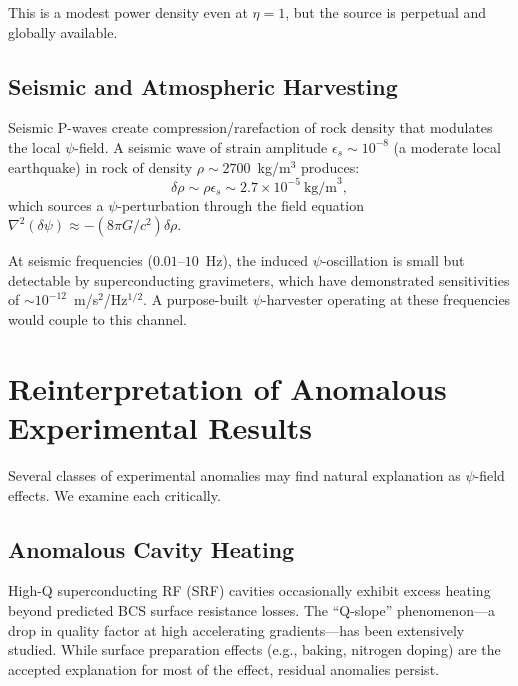 \documentclass[aps,prd,twocolumn,showpacs,preprintnumbers,superscriptaddress,nofootinbib]{revtex4-2}
\begin{document}
This is a modest power density even at $\eta = 1$, but the source is
perpetual and globally available.

\subsection{Seismic and Atmospheric Harvesting}\label{sec:seismic}

Seismic P-waves create compression/rarefaction of rock density that
modulates the local $\psi$-field.  A seismic wave of strain amplitude
$\epsilon_s \sim 10^{-8}$ (a moderate local earthquake) in rock of
density $\rho \sim 2700$~kg/m$^3$ produces:
\begin{equation}
\delta\rho \sim \rho\epsilon_s \sim 2.7\times 10^{-5}~\text{kg/m}^3,
\end{equation}
which sources a $\psi$-perturbation through the field equation
$\nabla^2(\delta\psi) \approx -(8\pi G/c^2)\delta\rho$.

At seismic frequencies ($0.01$--$10$~Hz), the induced $\psi$-oscillation
is small but detectable by superconducting gravimeters, which have
demonstrated sensitivities of $\sim 10^{-12}$~m/s$^2$/Hz$^{1/2}$.
A purpose-built $\psi$-harvester operating at these frequencies would
couple to this channel.

\section{Reinterpretation of Anomalous Experimental Results}\label{sec:anomalous}

Several classes of experimental anomalies may find natural explanation
as $\psi$-field effects.  We examine each critically.

\subsection{Anomalous Cavity Heating}\label{sec:cavity-heating}

High-Q superconducting RF (SRF) cavities occasionally exhibit excess
heating beyond predicted BCS surface resistance losses.  The ``Q-slope''
phenomenon---a drop in quality factor at high accelerating
gradients---has been extensively studied.  While surface preparation
effects (e.g., baking, nitrogen doping) are the accepted explanation
for most of the effect, residual anomalies persist.
\end{document}
